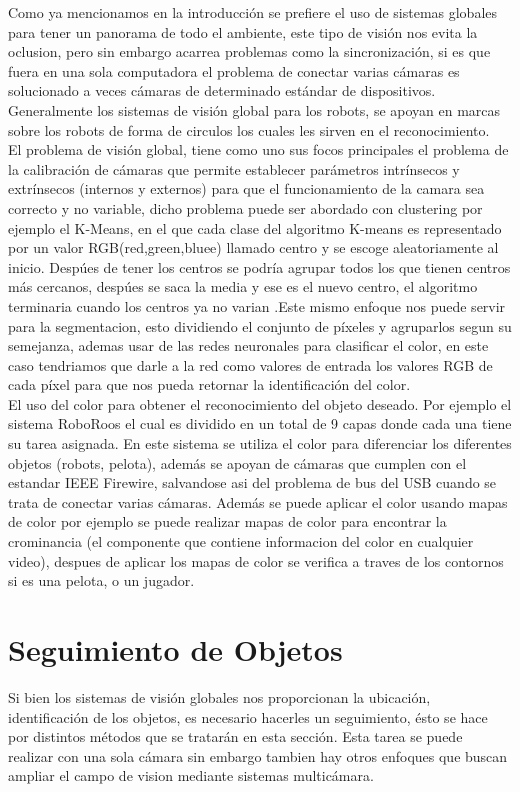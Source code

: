 Como ya mencionamos en la introducci\'on se prefiere el uso de sistemas globales para tener un panorama de todo el ambiente, este tipo de visi\'on nos evita la oclusion, pero sin embargo acarrea problemas como la sincronizaci\'on, si es que fuera en una sola computadora el problema de conectar varias c\'amaras es solucionado a veces c\'amaras de determinado est\'andar de dispositivos. Generalmente los sistemas de visi\'on global para los robots, se apoyan en marcas sobre los robots de forma de circulos los cuales les sirven  en el reconocimiento.\\
El problema de visi\'on global, tiene como uno sus focos principales el problema de la calibraci\'on de c\'amaras que permite establecer par\'ametros intr\'insecos y extr\'insecos (internos y externos) para que el funcionamiento de la camara sea correcto y no variable, dicho problema puede ser abordado con clustering por ejemplo el K-Means, en el que cada clase del algoritmo K-means es representado por un valor RGB(red,green,bluee) llamado centro  y se escoge aleatoriamente al inicio. Desp\'ues de tener los centros se podr\'ia agrupar  todos los que tienen centros m\'as cercanos, desp\'ues se saca la media y ese es el nuevo centro, el algoritmo terminaria cuando los centros ya no varian \cite{kelson_glo}.Este mismo enfoque nos puede servir para la segmentacion, esto dividiendo el conjunto de p\'ixeles y agruparlos segun su semejanza, ademas usar  de las redes neuronales para clasificar el color, en este caso tendriamos que darle a la red como valores de entrada los valores RGB de cada p\'ixel para que nos pueda retornar la identificaci\'on del color\cite{chabra_glo}.\\
El uso del color para obtener el reconocimiento del objeto deseado. Por ejemplo el sistema RoboRoos el cual es dividido en un total de 9 capas donde cada una tiene su tarea asignada. En este sistema se utiliza el color para diferenciar los diferentes objetos (robots, pelota), adem\'as se apoyan de c\'amaras que cumplen con el estandar IEEE Firewire, salvandose asi del problema de bus del USB cuando se trata de conectar varias c\'amaras\cite{ball_glo}. Adem\'as se puede aplicar el color usando mapas de color por ejemplo se puede realizar mapas de color para encontrar la crominancia (el componente que contiene informacion del color en cualquier video), despues de aplicar los mapas de color se verifica a traves de los contornos si es una pelota, o un jugador\cite{clau_glo}.
\\


\section{\textbf{Seguimiento de Objetos }}
Si bien los sistemas de visi\'on globales nos proporcionan la ubicaci\'on, identificaci\'on de los objetos, es necesario hacerles un seguimiento, \'esto se hace por distintos m\'etodos que se tratar\'an en esta secci\'on. Esta tarea se puede realizar con una sola c\'amara sin embargo tambien hay otros enfoques que buscan ampliar el campo de vision mediante sistemas multic\'amara.\\

